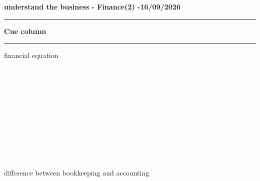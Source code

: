 \documentclass[12pt,a4paper]{report}
\begin{document}
\newpage
\thispagestyle{empty}
\begin{center}
    {\Large\textbf{understand the business - Finance(2) -16/09/2026}}\\[0.5em]
    \rule{\textwidth}{0.4pt}
\end{center}

\noindent
\begin{minipage}[t]{0.27\textwidth}
    \textbf{Cue column}\\[0.5em]
    \rule{\linewidth}{0.4pt}
    financial equation
    \\ \\ \\ \\
     \\ \\ \\ \\
     \\\\\\\\
     difference between bookkeeping and accounting
    \\ \\ \\ \\

\end{minipage}%
\hfill
\end{document}
